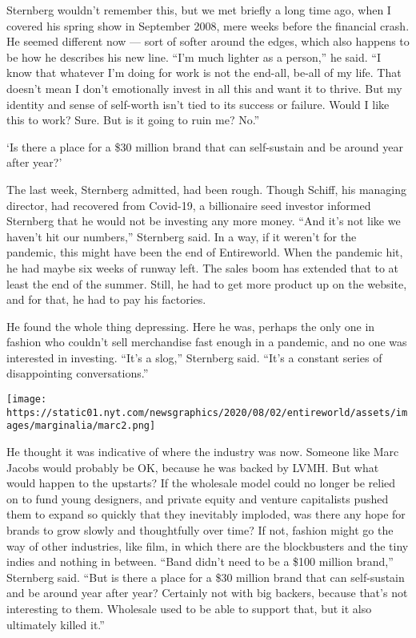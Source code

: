 Sternberg wouldn't remember this, but we met briefly a long time ago,
when I covered his spring show in September 2008, mere weeks before the
financial crash. He seemed different now --- sort of softer around the
edges, which also happens to be how he describes his new line. ``I'm
much lighter as a person,'' he said. ``I know that whatever I'm doing
for work is not the end-all, be-all of my life. That doesn't mean I
don't emotionally invest in all this and want it to thrive. But my
identity and sense of self-worth isn't tied to its success or failure.
Would I like this to work? Sure. But is it going to ruin me? No.''

`Is there a place for a \$30 million brand that can self-sustain and be
around year after year?'

The last week, Sternberg admitted, had been rough. Though Schiff, his
managing director, had recovered from Covid-19, a billionaire seed
investor informed Sternberg that he would not be investing any more
money. ``And it's not like we haven't hit our numbers,'' Sternberg said.
In a way, if it weren't for the pandemic, this might have been the end
of Entireworld. When the pandemic hit, he had maybe six weeks of runway
left. The sales boom has extended that to at least the end of the
summer. Still, he had to get more product up on the website, and for
that, he had to pay his factories.

He found the whole thing depressing. Here he was, perhaps the only one
in fashion who couldn't sell merchandise fast enough in a pandemic, and
no one was interested in investing. ``It's a slog,'' Sternberg said.
``It's a constant series of disappointing conversations.''

\texttt{[image: https://static01.nyt.com/newsgraphics/2020/08/02/entireworld/assets/images/marginalia/marc2.png]}

He thought it was indicative of where the industry was now. Someone like
Marc Jacobs would probably be OK, because he was backed by LVMH. But
what would happen to the upstarts? If the wholesale model could no
longer be relied on to fund young designers, and private equity and
venture capitalists pushed them to expand so quickly that they
inevitably imploded, was there any hope for brands to grow slowly and
thoughtfully over time? If not, fashion might go the way of other
industries, like film, in which there are the blockbusters and the tiny
indies and nothing in between. ``Band didn't need to be a \$100 million
brand,'' Sternberg said. ``But is there a place for a \$30 million brand
that can self-sustain and be around year after year? Certainly not with
big backers, because that's not interesting to them. Wholesale used to
be able to support that, but it also ultimately killed it.''

